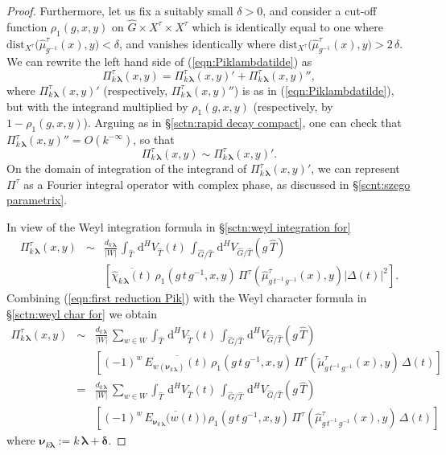\documentclass[12pt,a4paper]{article}
\theoremstyle{plain}
\theoremstyle{definition}
\begin{document}
\begin{proof}
Furthermore, let us fix a suitably small $\delta>0$,
and consider a cut-off function
$\rho_1(g,x,y)$ on $\hat{G}\times X^\tau\times X^\tau$ which is identically equal to one where 
$\mathrm{dist}_{X^\tau}\big(\hat{\mu}^\tau_{g^{-1}}(x),y   \big)
<\delta$, and vanishes identically where $\mathrm{dist}_{X^\tau}\big(\hat{\mu}^\tau_{g^{-1}}(x),y   \big)
>2\,\delta$. We can rewrite the left hand side of
(\ref{eqn:Piklambdatilde})  as
$$
\Pi^\tau_{k\,\boldsymbol{\lambda}}(x,y)=
\Pi^\tau_{k\,\boldsymbol{\lambda}}(x,y)'+
\Pi^\tau_{k\,\boldsymbol{\lambda}}(x,y)'',
$$
where $\Pi^\tau_{k\,\boldsymbol{\lambda}}(x,y)'$
(respectively,  $\Pi^\tau_{k\,\boldsymbol{\lambda}}(x,y)''$) is as in 
(\ref{eqn:Piklambdatilde}), but with the integrand multiplied by 
$\rho_1(g,x,y)$ (respectively, by $1-\rho_1(g,x,y)$).
Arguing as in \S \ref{sctn:rapid decay compact}, 
one can check that $\Pi^\tau_{k\,\boldsymbol{\lambda}}(x,y)''
=O\left(k^{-\infty}\right)$, so that 
$$
\Pi^\tau_{k\,\boldsymbol{\lambda}}(x,y)\sim
\Pi^\tau_{k\,\boldsymbol{\lambda}}(x,y)'.
$$
On the domain of integration of the integrand of $\Pi^\tau_{k\,\boldsymbol{\lambda}}(x,y)'$, we can represent $\Pi^\tau$ as a Fourier
integral operator with complex phase, as discussed in \S \ref{scnt:szego parametrix}.

In view of the Weyl integration formula in \S \ref{sctn:weyl integration for}
\begin{eqnarray}
\label{eqn:first reduction Pik}
\Pi^\tau_{k\,\boldsymbol{\lambda}}(x,y)&\sim&
\frac{d_{k\,\boldsymbol{\lambda}}}{|W|}\,
\int_{\hat{T}}\,\mathrm{d}^HV_{\hat{T}}(t)\,\int_{\hat{G}/\hat{T}}
\,\mathrm{d}^HV_{\hat{G}/\hat{T}}(g\,\hat{T})\\
&&\left[\overline{\hat{\chi}_{k\,\boldsymbol{\lambda}}(t)}
\,\rho_1\left(g\,t\,g^{-1},x,y\right)\,
\Pi^\tau
\left(\hat{\mu}^\tau_{g\,t^{-1}\,g^{-1}}(x),y   \right)
|\Delta(t)|^2\right].\nonumber
\end{eqnarray}
Combining (\ref{eqn:first reduction Pik}) with the Weyl character formula
in \S \ref{sctn:weyl char for} we obtain
\begin{eqnarray}
\label{eqn:second reduction Pik}
\Pi^\tau_{k\,\boldsymbol{\lambda}}(x,y)&\sim&
\frac{d_{k\,\boldsymbol{\lambda}}}{|W|}\,\sum_{w\in W}
\int_{\hat{T}}\,\mathrm{d}^HV_{\tilde{T}}(t)\,\int_{\hat{G}/\hat{T}}
\,\mathrm{d}^HV_{\hat{G}/\hat{T}}(g\,\hat{T})\\
&&\left[(-1)^w\,\overline{E_{w(\boldsymbol{\nu}_{k\,\boldsymbol{\lambda}})}
(t)}
\,\rho_1\left(g\,t\,g^{-1},x,y\right)\,
\Pi^\tau
\left(\tilde{\mu}^\tau_{g\,t^{-1}\,g^{-1}}(x),y   \right)
\,\Delta(t)\right]\nonumber\\
&=&
\frac{d_{k\,\boldsymbol{\lambda}}}{|W|}\,\sum_{w\in W}
\int_{\hat{T}}\,\mathrm{d}^HV_{\hat{T}}(t)\,\int_{\hat{G}/\hat{T}}
\,\mathrm{d}^HV_{\hat{G}/\hat{T}}(g\,\hat{T})\nonumber\\
&&\left[(-1)^w\,\overline{E_{\boldsymbol{\nu}_{k\,\boldsymbol{\lambda}}}
\big(w(t)\big)}
\,\rho_1\left(g\,t\,g^{-1},x,y\right)\,
\Pi^\tau
\left(\hat{\mu}^\tau_{g\,t^{-1}\,g^{-1}}(x),y   \right)
\,\Delta(t)\right]\nonumber
\end{eqnarray}
where $\boldsymbol{\nu}_{k\boldsymbol{\lambda}}:=
k\,\boldsymbol{\lambda}+\boldsymbol{\delta}$.


\end{proof}
\end{document}
